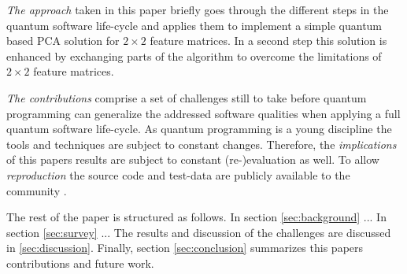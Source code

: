 \emph{The approach} taken in this paper briefly goes through the different steps in the quantum software life-cycle and applies them to implement a simple quantum based PCA solution for $2 \times 2$ feature matrices. In a second step this solution is enhanced by exchanging parts of the algorithm to overcome the limitations of $2 \times 2$ feature matrices.

\emph{The contributions} comprise a set of challenges still to take before quantum programming can generalize the addressed software qualities when applying a full quantum software life-cycle. As quantum programming is a young discipline the tools and techniques are subject to constant changes. Therefore, the \emph{implications} of this papers results are subject to constant (re-)evaluation as well. To allow \emph{reproduction} the source code and test-data are publicly available to the community \cite{github_repo}.

The rest of the paper is structured as follows. In section \ref{sec:background} ... In section \ref{sec:survey} ... The results and discussion of the challenges are discussed in \ref{sec:discussion}. Finally, section \ref{sec:conclusion} summarizes this papers contributions and future work.
